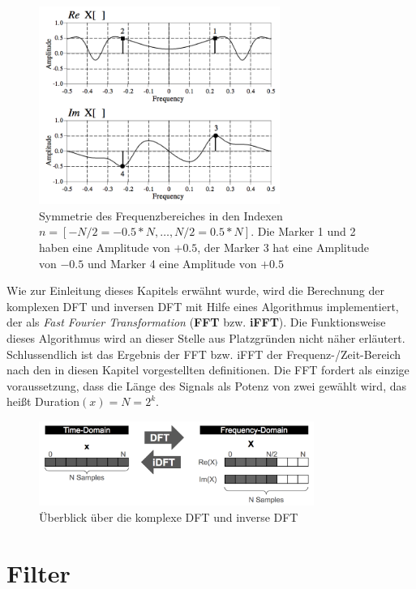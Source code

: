  \begin{figure}[h]
 	\centering
 	\includegraphics[width=0.7\textwidth]{bilder/dftSymmetrie.png}
 	\caption{Symmetrie des Frequenzbereiches in den Indexen $n = [-N/2 = -0.5*N ,\ldots ,  N/2 = 0.5*N]$. Die Marker 1 und 2 haben eine Amplitude von $+0.5$, der Marker 3 hat eine Amplitude von $-0.5$ und Marker 4 eine Amplitude von $+0.5$ }
 	\label{img:symmetrieInDFT}
 \end{figure} 
 
 
Wie zur Einleitung dieses Kapitels erwähnt wurde, wird die Berechnung der komplexen DFT und inversen DFT mit Hilfe eines Algorithmus implementiert, der als \emph{Fast Fourier Transformation} (\textbf{FFT} bzw. \textbf{iFFT}). Die Funktionsweise dieses Algorithmus wird an dieser Stelle aus Platzgründen nicht näher erläutert. Schlussendlich ist das Ergebnis der FFT bzw. iFFT der Frequenz-/Zeit-Bereich nach den in diesen Kapitel vorgestellten definitionen. Die FFT fordert als einzige voraussetzung, dass die Länge des Signals als Potenz von zwei gewählt wird, das heißt Duration$(x) = N = 2^k$. \cite[S. 225 - 226]{dspGuide}

\begin{figure}[h]
	\centering
	\includegraphics[width=0.8\textwidth]{bilder/compDFTOverview.png}
	\caption{Überblick über die komplexe DFT und inverse DFT}
	\label{img:complexDFTOverview}
\end{figure}

\section{Filter}
\label{sec:filter}

